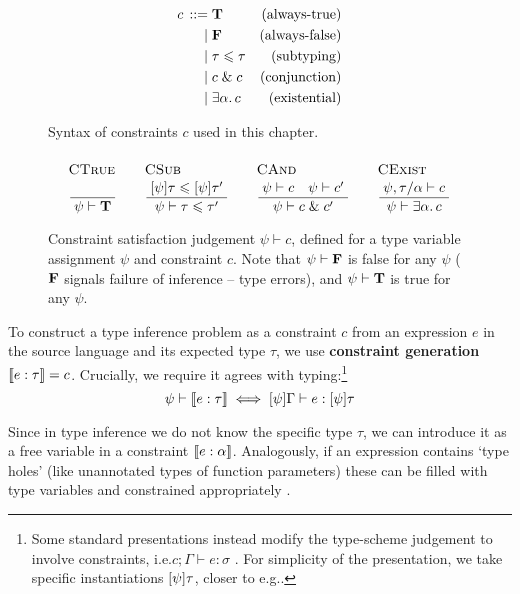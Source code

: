 \begin{figure}
    \centering
    \begin{align*}
        {c} \,::=&\; 
        \mathbf T
        & \text{(always-true)}
        \\ \mid&\;
        \mathbf F
        & \text{(always-false)}
        \\ \mid&\;
        \tau \leqslant \tau 
        & \text{(subtyping)}
        \\ \mid&\;
        c \;\&\; c
         & \text{(conjunction)}
        \\ \mid&\; 
        \exists \alpha \ldotp c
        & \text{(existential)}
    \end{align*}
    \caption{Syntax of constraints $c$ used in this chapter.}
    \label{fig:constraints}
\end{figure}

\begin{figure}
    \centering
    $$
    \irule{CTrue}{}{\psi \vdash \tru}
    \quad
    \irule{CSub}{\substx \psi \tau \sub \substx \psi \tau'}{\psi \vdash \tau \sub \tau'}
    \quad
    \irule{CAnd}{\psi \vdash c \quad \psi \vdash c'}{\psi \vdash c \und c'}
    \quad 
    \irule{CExist}{\psi, \tau/\alpha \vdash c}{\psi \vdash \exists \alpha \ldotp c}
    $$
    \caption{Constraint satisfaction judgement $\psi \vdash c$, defined for a type variable assignment $\psi$ and constraint $c$. Note that $\psi \vdash \mathbf F$ is false for any $\psi$ ($\mathbf F$ signals failure of inference -- type errors), and $\psi \vdash \mathbf T$ is true for any $\psi$.}
    \label{fig:satisfaction}
\end{figure}
 
To construct a type inference problem as a constraint $c$ from an expression $e$ in the source language and its expected type $\tau$, we use \textbf{constraint generation} $\denot{e : \tau} = c$. Crucially, we require it agrees with typing:\footnote{Some standard presentations instead modify the type-scheme judgement to involve constraints, i.e.\@ $c; \Gamma \vdash e : \sigma$ \cite{essence-of-ml-type-inference}. For simplicity of the presentation, we take specific instantiations $\substx \psi \tau$, closer to e.g.\@ \cite[Section 3.4]{constraint-based-freeze-ml}.}
$$ \psi \vdash \denot{e : \tau} \iff \substx{\psi}\Gamma \vdash e : \substx \psi \tau $$

Since in type inference we do not know the specific type $\tau$, we can introduce it as a free variable in a constraint $\denot{e : \alpha}$. Analogously, if an expression contains `type holes' (like unannotated types of function parameters) these can be filled with type variables and constrained appropriately \cite{tapl}.

